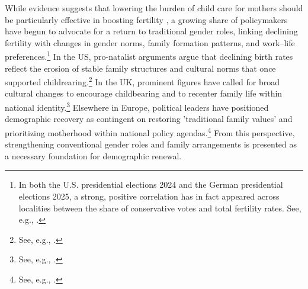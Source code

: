 \documentclass[a4paper,oneside,final,onecolumn,12pt,english]{article}
\begin{document}

While evidence suggests that lowering the burden of child care for mothers should be particularly effective in boosting fertility \citep{doepke2019bargaining,SakamotoMinami2024}, a growing share of policymakers have begun to advocate for a return to traditional gender roles, linking declining fertility with changes in gender norms, family formation patterns, and work–life preferences.\footnote{In both the U.S. presidential elections 2024 and the German presidential elections 2025, a strong, positive correlation has in fact appeared across localities between the share of conservative votes and total fertility rates. See, e.g., \cite{IFS_TrumpBump2024, MoreBirths2025}.} In the US, pro-natalist arguments argue that declining birth rates reflect the erosion of stable family structures and cultural norms that once supported childrearing.\footnote{See, e.g., \citet{vance_people_datingapps_2025, vance_marchforlife_2025}.} In the UK, prominent figures have called for broad cultural changes to encourage childbearing and to recenter family life within national identity.\footnote{See, e.g., \citet{cates_natcon_2023, farage_ft_2025, farage_guardian_2025}.} Elsewhere in Europe, political leaders have positioned demographic recovery as contingent on restoring 'traditional family values' and prioritizing motherhood within national policy agendas.\footnote{See, e.g., \citet{time_erdogan_mother_2016, meloni_states_natality_2023, meloni_budapest_2023, orban_balvanyos_2024}.} From this perspective, strengthening conventional gender roles and family arrangements is presented as a necessary foundation for demographic renewal.
\end{document}

